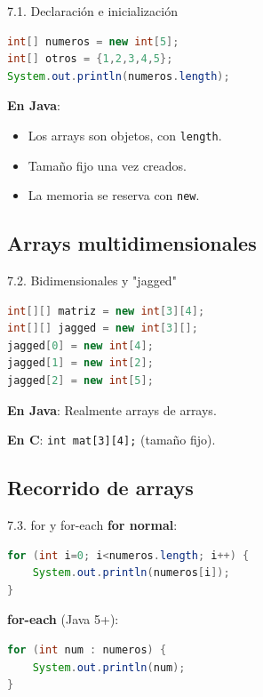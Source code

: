 \documentclass{beamer}
\begin{document}
\begin{frame}[fragile]{7.1. Declaración e inicialización}
\begin{lstlisting}[language=Java]
int[] numeros = new int[5];
int[] otros = {1,2,3,4,5};
System.out.println(numeros.length);
\end{lstlisting}

\textbf{En Java}:
\begin{itemize}
  \item Los arrays son objetos, con \texttt{length}.
  \item Tamaño fijo una vez creados.
  \item La memoria se reserva con \texttt{new}.
\end{itemize}
\end{frame}

\subsection{Arrays multidimensionales}

\begin{frame}[fragile]{7.2. Bidimensionales y "jagged"}
\begin{lstlisting}[language=Java]
int[][] matriz = new int[3][4];
int[][] jagged = new int[3][];
jagged[0] = new int[4];
jagged[1] = new int[2];
jagged[2] = new int[5];
\end{lstlisting}

\textbf{En Java}: Realmente arrays de arrays.  

\textbf{En C}: \texttt{int mat[3][4];} (tamaño fijo).
\end{frame}

\subsection{Recorrido de arrays}

\begin{frame}[fragile]{7.3. for y for-each}
\textbf{for normal}:
\begin{lstlisting}[language=Java]
for (int i=0; i<numeros.length; i++) {
    System.out.println(numeros[i]);
}
\end{lstlisting}

\textbf{for-each} (Java 5+):
\begin{lstlisting}[language=Java]
for (int num : numeros) {
    System.out.println(num);
}
\end{lstlisting}
\end{frame}
\end{document}
